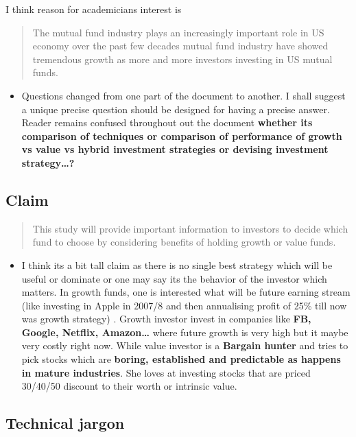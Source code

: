 \documentclass[]{tufte-handout}
\providecommand{\tightlist}{%
  \setlength{\itemsep}{0pt}\setlength{\parskip}{0pt}}
\begin{document}
I think reason for academicians interest is

\begin{quote}
The mutual fund industry plays an increasingly important role in US
economy over the past few decades mutual fund industry have showed
tremendous growth as more and more investors investing in US mutual
funds.
\end{quote}

\begin{itemize}
\tightlist
\item
  Questions changed from one part of the document to another. I shall
  suggest a unique precise question should be designed for having a
  precise answer. Reader remains confused throughout out the document
  \textbf{whether its comparison of techniques or comparison of
  performance of growth vs value vs hybrid investment strategies or
  devising investment strategy\ldots?}
\end{itemize}

\hypertarget{claim}{%
\subsection{Claim}\label{claim}}

\begin{quote}
This study will provide important information to investors to decide
which fund to choose by considering benefits of holding growth or value
funds.
\end{quote}

\begin{itemize}
\tightlist
\item
  I think its a bit tall claim as there is no single best strategy which
  will be useful or dominate or one may say its the behavior of the
  investor which matters. In growth funds, one is interested what will
  be future earning stream (like investing in Apple in 2007/8 and then
  annualising profit of 25\% till now was growth strategy) . Growth
  investor invest in companies like \textbf{FB, Google, Netflix,
  Amazon\ldots{}} where future growth is very high but it maybe very
  costly right now. While value investor is a \textbf{Bargain hunter}
  and tries to pick stocks which are \textbf{boring, established and
  predictable as happens in mature industries}. She loves at investing
  stocks that are priced 30/40/50 discount to their worth or intrinsic
  value.
\end{itemize}

\hypertarget{technical-jargon}{%
\subsection{Technical jargon}\label{technical-jargon}}
\end{document}
